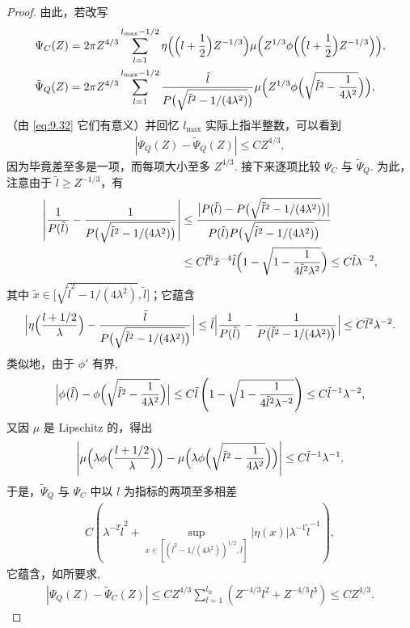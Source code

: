 \begin{proof}
由此，若改写
\begin{align*}
  \Psi_{C}(Z)&=2\pi Z^{4/3}\sum_{l=1}^{l_{\max}-1/2}
   \eta\Bigl(\Bigl(l+\frac{1}{2}\Bigr)Z^{-1/3}\Bigr)
   \mu\Bigl(Z^{1/3}\phi\Bigl(\Bigl(l+\frac{1}{2}\Bigr)Z^{-1/3}\Bigr)\Bigr),\\
  \tilde{\Psi}_{Q}(Z)&=2\pi Z^{4/3}\sum_{l=1}^{l_{\max}-1/2}
   \frac{\tilde{l}}{P\bigl(\sqrt{\tilde{l}^{2}-1/(4\lambda^{2})}\bigr)}
   \mu\Bigl(Z^{1/3}\phi\Bigl(\sqrt{\tilde{l}^{2}-\frac{1}{4\lambda^{2}}}\Bigr)\Bigr),
\end{align*}
（由 \eqref{eq:9.32} 它们有意义）并回忆 $l_{\max}$ 实际上指半整数，可以看到
\begin{align*}
  |\Psi_{Q}(Z)-\tilde{\Psi}_{Q}(Z)|\leq C Z^{4/3},
\end{align*}
因为毕竟差至多是一项，而每项大小至多 $Z^{4/3}$. 接下来逐项比较 $\Psi_C$ 与 $\tilde{\Psi}_Q$. 为此，注意由于 $\tilde{l} \geq Z^{-1/3}$，有
\begin{align*}
  \left|\frac{1}{P(\tilde{l})}-\frac{1}{P\bigl(\sqrt{\tilde{l}^{2}-1/(4\lambda^{2})}\bigr)}\right|
  &\leq\frac{\bigl|P(\tilde{l})-P\bigl(\sqrt{\tilde{l}^{2}-1/(4\lambda^{2})}\bigr)\bigr|}
  {P(\tilde{l})P\bigl(\sqrt{\tilde{l}^{2}-1/(4\lambda^{2})}\bigr)}\\
  &\leq C\tilde{l}^{6}\tilde{x}^{-4}\tilde{l}\Bigl(1-\sqrt{1-\frac{1}{4\tilde{l}^{2}\lambda^{2}}}\Bigr)
  \leq C\tilde{l}\lambda^{-2},
\end{align*}
其中 $\tilde{x}\in\bigl[\sqrt{\tilde{l}^{2}-1/(4\lambda^{2})},\tilde{l}\bigr]$；它蕴含
\begin{align*}
  \Big|\eta\Bigl(\frac{l+1/2}{\lambda}\Bigr)-\frac{\tilde{l}}{P\bigl(\sqrt{\tilde{l}^{2}-1/(4\lambda^{2})}\bigr)}\Big|
  \leq\tilde{l}\Big|\frac{1}{P(\tilde{l})}-\frac{1}{P\bigl(\tilde{l}^{2}-1/(4\lambda^{2})\bigr)}\Big|
  \leq C\tilde{l}^{2}\lambda^{-2}.
\end{align*}
类似地，由于 $\phi'$ 有界,
\begin{align*}
  \Big|\phi\bigl(\tilde{l}\bigr)-\phi\Bigl(\sqrt{\tilde{l}^{2}-\frac{1}{4\lambda^{2}}}\Bigr)\Big|
  \leq C\tilde{l}\left(1-\sqrt{1-\frac{1}{4\tilde{l}^{2}\lambda^{-2}}}\right)
  \leq C\tilde{l}^{-1}\lambda^{-2},
\end{align*}
又因 $\mu$ 是 Lipschitz 的，得出
\begin{align*}
  \left|\mu\Bigl(\lambda\phi\Bigl(\frac{l+1/2}{\lambda}\Bigr)\Bigr)
  -\mu\Bigl(\lambda\phi\Bigl(\sqrt{\tilde{l}^{2}-\frac{1}{4\lambda^{2}}}\Bigr)\Bigr)\right|
  \leq C\tilde{l}^{-1}\lambda^{-1}.
\end{align*}
于是，$\tilde{\Psi}_{Q}$ 与 $\Psi_{C}$ 中以 $l$ 为指标的两项至多相差
\begin{align*}
  C\left(\lambda^{-2}\tilde{l}^{2}
  +\sup_{x\in[(\bar{l}^{2}-1/(4\lambda^{2}))^{1/2},\bar{l}]}|\eta(x)|\lambda^{-1}\tilde{l}^{-1}\right),
\end{align*}
它蕴含，如所要求,
\begin{align*}
  |\Psi_{Q}(Z)-\tilde{\Psi}_{C}(Z)|\leq C Z^{4/3}\sum_{l=1}^{l_{\mathrm{tr}}}(Z^{-4/3}l^{2}+Z^{-4/3}l^{3})
  \leq C Z^{4/3}.
\end{align*}
\end{proof}

